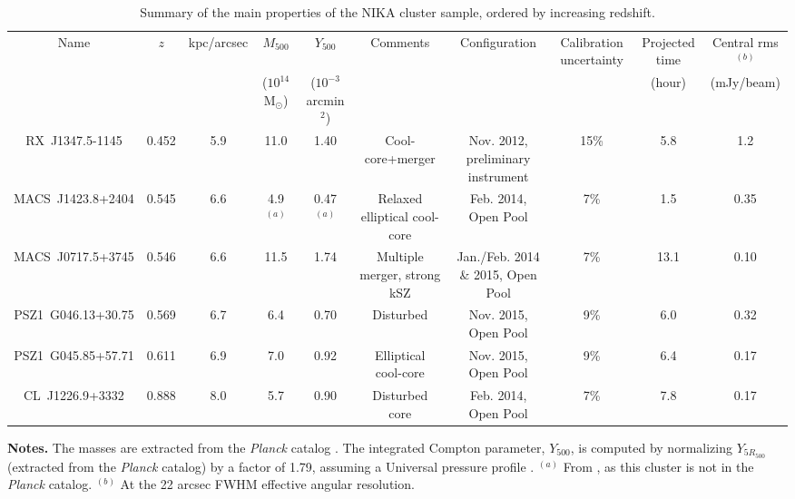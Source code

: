 \documentclass[twocolumn,traditabstract]{aa}
\begin{document}
\begin{table}[]
\caption{\footnotesize{Summary of the main properties of the NIKA cluster sample, ordered by increasing redshift.}}
\begin{center}
\resizebox{\textwidth}{!} {
\begin{tabular}{c|c|c|c|c|c||c|c|c|c}
\hline
\hline
Name & $z$ & kpc/arcsec & $M_{500}$ & $Y_{500}$ & Comments & Configuration & Calibration uncertainty & Projected time & Central rms$^{(b)}$ \\
 &  & & ($10^{14}$ M$_{\odot}$)& ($10^{-3}$arcmin$^2$) & & & & (hour) & (mJy/beam) \\
\hline
RX~J1347.5-1145 & 0.452 & 5.9 & 11.0 & 1.40 & Cool-core+merger & Nov. 2012, preliminary instrument & 15\% & 5.8 & 1.2 \\ 
MACS~J1423.8+2404 & 0.545 & 6.6 & 4.9 $^{(a)}$ & 0.47 $^{(a)}$ & Relaxed elliptical cool-core & Feb. 2014, Open Pool & 7\% &1.5 & 0.35 \\ 
MACS~J0717.5+3745 & 0.546 & 6.6 & 11.5 & 1.74 & Multiple merger, strong kSZ & Jan./Feb. 2014 \& 2015, Open Pool & 7\% & 13.1 & 0.10 \\ 
PSZ1~G046.13+30.75 & 0.569 & 6.7 & 6.4 & 0.70 & Disturbed & Nov. 2015, Open Pool & 9\% & 6.0 &  0.32\\ 
PSZ1~G045.85+57.71 & 0.611 & 6.9 & 7.0 & 0.92 & Elliptical cool-core & Nov. 2015, Open Pool & 9\% & 6.4 & 0.17 \\ 
CL~J1226.9+3332 &  0.888 & 8.0 & 5.7 & 0.90 & Disturbed core & Feb. 2014, Open Pool & 7\% & 7.8 & 0.17 \\ 
\hline
\end{tabular}
}
\end{center}
{\small {\bf Notes.} The masses are extracted from the \textit{Planck} catalog \citep{PlanckXXVII2015}. The integrated Compton parameter, $Y_{500}$, is computed by normalizing $Y_{5R_{500}}$ (extracted from the \textit{Planck} catalog) by a factor of 1.79, assuming a Universal pressure profile \citep{Arnaud2010}. $^{(a)}$ From \cite{Adam2016a}, as this cluster is not in the \textit{Planck} catalog. $^{(b)}$ At the 22 arcsec FWHM effective angular resolution.}
\label{tab:cluster_summary}
\end{table}
\end{document}
